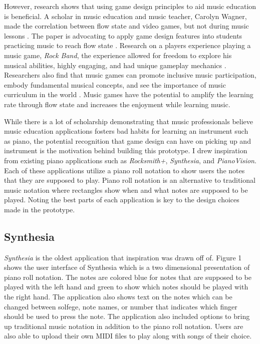 \documentclass[10pt,twocolumn]{article}
\begin{document}
However, research shows that using game design principles to aid music education is beneficial. A scholar in music education and music teacher, Carolyn Wagner, made the correlation between flow state and video games, but not during music lessons \cite{Wagner}. The paper is advocating to apply game design features into students practicing music to reach flow state \cite{Wagner}. Research on a players experience playing a music game, \textit{Rock Band}, the experience allowed for freedom to explore his musical abilities, highly engaging, and had unique gameplay mechanics \cite{Cassidy}. Researchers also find that music games can promote inclusive music participation, embody fundamental musical concepts, and see the importance of music curriculum in the world \cite{Cassidy}. Music games have the potential to amplify the learning rate through flow state and increases the enjoyment while learning music. 

While there is a lot of scholarship demonstrating that music professionals believe music education applications fosters bad habits for learning an instrument such as piano, the potential recognition that game design can have on picking up and instrument is the motivation behind building this prototype. I drew inspiration from existing piano applications such as \textit{Rocksmith+}, \textit{Synthesia}, and \textit{PianoVision}. Each of these applications utilize a piano roll notation to show users the notes that they are supposed to play. Piano roll notation is an alternative to traditional music notation where rectangles show when and what notes are supposed to be played. Noting the best parts of each application is key to the design choices made in the prototype.

\subsection{Synthesia}

\textit{Synthesia} is the oldest application that inspiration was drawn off of. Figure 1 shows the user interface of Synthesia which is a two dimensional presentation of piano roll notation. The notes are colored blue for notes that are supposed to be played with the left hand and green to show which notes should be played with the right hand. The application also shows text on the notes which can be changed between solfege, note names, or number that indicates which finger should be used to press the note. The application also included options to bring up traditional music notation in addition to the piano roll notation. Users are also able to upload their own MIDI files to play along with songs of their choice. 
\end{document}
